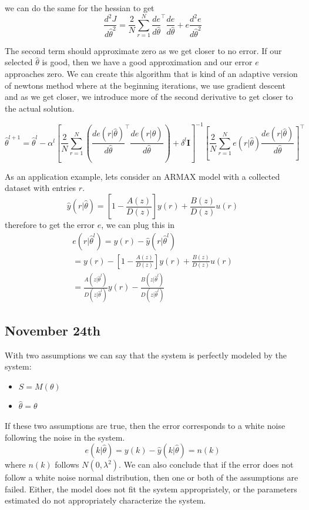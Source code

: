 \documentclass[11pt]{article}
\begin{document}
we can do the same for the hessian to get
\begin{equation}
    \frac{d^2 J}{d \hat{\theta}^2 } = \frac{2}{N} \sum_{r=1}^{N} \frac{d e}{d \hat{\theta}}^\top \frac{d e}{d \hat{\theta}} + e \frac{d^2 e}{d \hat{\theta}^2}
\end{equation}

The second term should approximate zero as we get closer to no error.
If our selected $\hat{\theta}$ is good, then we have a good approximation and our error $e$ approaches zero.
We can create this algorithm that is kind of an adaptive version of newtons method where at the beginning iterations, we use gradient descent and as we get closer, we introduce more of the second derivative to get closer to the actual solution.

\begin{equation}
   \hat{\theta}^{l+1} = \hat{\theta}^l - \alpha^l [\frac{2}{N} \sum_{r=1}^{N} (\frac{d e(r|\hat{\theta})}{d \hat{\theta}}^\top \frac{d e(r|\hat{\theta})}{d \hat{\theta}}) + \delta^l \textbf{I} ]^{-1} [\frac{2}{N} \sum_{r=1}^{N} e(r|\hat{\theta}) \frac{d e(r|\hat{\theta})}{d \hat{\theta} } ]^\top
\end{equation}

As an application example, lets consider an ARMAX model with a collected dataset with entries $r$.
\begin{equation}
    \hat{y}(r | \hat{\theta}) = [1-\frac{A(z)}{D(z)}] y(r) + \frac{B(z)}{D(z)} u(r)
\end{equation}
therefore to get the error $e$, we can plug this in
\begin{gather}
    e(r|\hat{\theta}^l) = y(r) - \hat{y}(r|\hat{\theta}^l) \\
    = y(r) - [1-\frac{A(z)}{D(z)}] y(r) + \frac{B(z)}{D(z)} u(r) \\
    = \frac{A(z|\hat{\theta}^l)}{D(z|\hat{\theta}^l)} y(r) - \frac{B(z|\hat{\theta}^l)}{D(z|\hat{\theta}^l)}
\end{gather}

\subsection{November 24th}
With two assumptions we can say that the system is perfectly modeled by the system:
\begin{itemize}
    \item $S = M(\theta)$
    \item $\hat{\theta} = \theta$
\end{itemize}
If these two assumptions are true, then the error corresponds to a white noise following the noise in the system.
\begin{equation}
    e(k | \hat{\theta}) = y(k) - \hat{y} (k| \hat{\theta}) = n(k)
\end{equation}
where $n(k)$ follows $N(0,\lambda^2)$.
We can also conclude that if the error does not follow a white noise normal distribution, then one or both of the assumptions are failed.
Either, the model does not fit the system appropriately, or the parameters estimated do not appropriately characterize the system.
\end{document}
